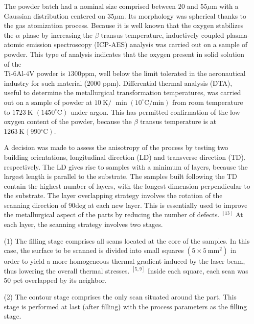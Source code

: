 \documentclass[10pt]{article}
\begin{document}
The powder batch had a nominal size comprised between 20 and $55 \mu \mathrm{m}$ with a Gaussian distribution centered on $35 \mu \mathrm{m}$. Its morphology was spherical thanks to the gas atomization process. Because it is well known that the oxygen stabilizes the $\alpha$ phase by increasing the $\beta$ transus temperature, inductively coupled plasma-atomic emission spectroscopy (ICP-AES) analysis was carried out on a sample of powder. This type of analysis indicates that the oxygen present in solid solution of the\\
Ti-6Al-4V powder is $1300 \mathrm{ppm}$, well below the limit tolerated in the aeronautical industry for such material (2000 ppm). Differential thermal analysis (DTA), useful to determine the metallurgical transformation temperatures, was carried out on a sample of powder at $10 \mathrm{~K} /$ $\min \left(10^{\circ} \mathrm{C} / \mathrm{min}\right)$ from room temperature to $1723 \mathrm{~K}$ $\left(1450^{\circ} \mathrm{C}\right)$ under argon. This has permitted confirmation of the low oxygen content of the powder, because the $\beta$ transus temperature is at $1263 \mathrm{~K}\left(990{ }^{\circ} \mathrm{C}\right)$.

A decision was made to assess the anisotropy of the process by testing two building orientations, longitudinal direction (LD) and transverse direction (TD), respectively. The LD gives rise to samples with a minimum of layers, because the largest length is parallel to the substrate. The samples built following the TD contain the highest number of layers, with the longest dimension perpendicular to the substrate. The layer overlapping strategy involves the rotation of the scanning direction of $90 \mathrm{deg}$ at each new layer. This is essentially used to improve the metallurgical aspect of the parts by reducing the number of defects. ${ }^{[13]}$ At each layer, the scanning strategy involves two stages.

(1) The filling stage comprises all scans located at the core of the samples. In this case, the surface to be scanned is divided into small squares $\left(5 \times 5 \mathrm{~mm}^{2}\right)$ in order to yield a more homogeneous thermal gradient induced by the laser beam, thus lowering the overall thermal stresses. ${ }^{[5,9]}$ Inside each square, each scan was 50 pct overlapped by its neighbor.

(2) The contour stage comprises the only scan situated around the part. This stage is performed at last (after filling) with the process parameters as the filling stage.
\end{document}
